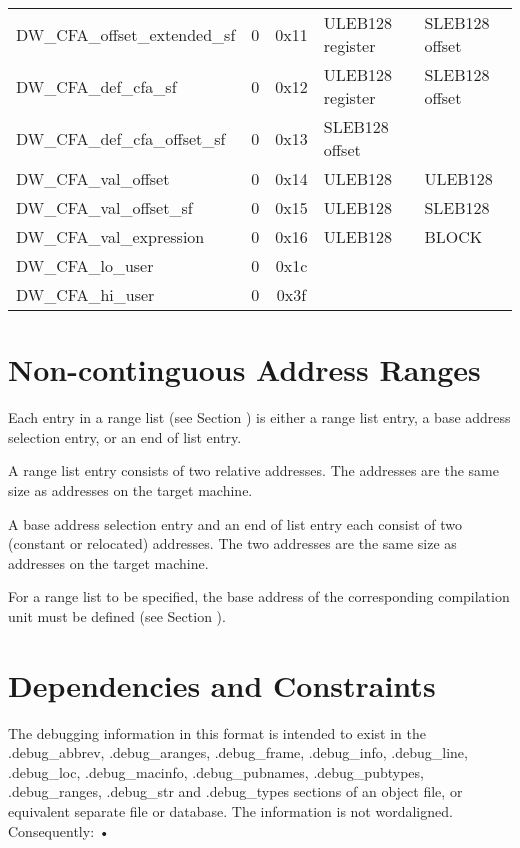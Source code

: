 \begin{centering}
\begin{longtable}{l|c|c|l|l}
DW\-\_CFA\-\_offset\-\_extended\-\_sf&0&0x11&ULEB128 register&SLEB128 offset \\
DW\-\_CFA\-\_def\-\_cfa\-\_sf&0&0x12&ULEB128 register&SLEB128 offset \\
DW\-\_CFA\-\_def\-\_cfa\-\_offset\-\_sf&0&0x13&SLEB128 offset & \\
DW\-\_CFA\-\_val\-\_offset&0&0x14&ULEB128&ULEB128 \\
DW\-\_CFA\-\_val\-\_offset\-\_sf&0&0x15&ULEB128&SLEB128 \\
DW\-\_CFA\-\_val\-\_expression&0&0x16&ULEB128&BLOCK  \\
DW\-\_CFA\-\_lo\-\_user&0&0x1c   & & \\
DW\-\_CFA\-\_hi\-\_user&0&0x3f & & \\
\end{longtable}
\end{centering}

\section{Non-continguous Address Ranges}
\label{datarep:noncontiguousaddressranges}

Each entry in a range list 
(see Section )
is either a
range list entry, a base address selection entry, or an end
of list entry.

A range list entry consists of two relative addresses. The
addresses are the same size as addresses on the target machine.

A base address selection entry and an end of list entry each
consist of two (constant or relocated) addresses. The two
addresses are the same size as addresses on the target machine.

For a range list to be specified, the base address of the
corresponding compilation unit must be defined 
(see Section ).


\section{Dependencies and Constraints}
\label{datarep:dependenciesandconstraints}

The debugging information in this format is intended to
exist in the .debug\_abbrev, .debug\_aranges, .debug\_frame,
.debug\_info, .debug\_line, .debug\_loc, .debug\_macinfo,
.debug\_pubnames, .debug\_pubtypes, .debug\_ranges, .debug\_str
and .debug\_types sections of an object file, or equivalent
separate file or database. The information is not 
word\dash aligned. Consequently: •

